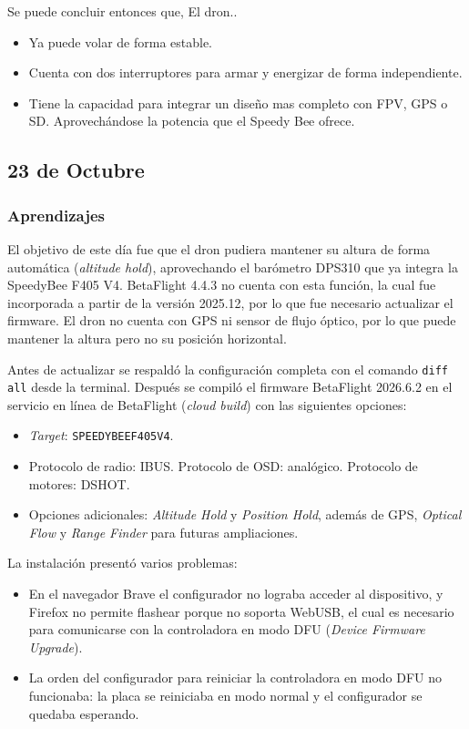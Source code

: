 \documentclass[pdflatex,sn-mathphys-num]{sn-jnl}%
\begin{document}
Se puede concluir entonces que, El dron..
\begin{itemize}
    \item Ya puede volar de forma estable.
    \item Cuenta con dos interruptores para armar y energizar de forma independiente.
    \item Tiene la capacidad para integrar un diseño mas completo con FPV, GPS o SD. Aprovechándose la potencia que el Speedy Bee ofrece.
\end{itemize}

\subsection{23 de Octubre \label{sec:10-23}}
\subsubsection{Aprendizajes}
El objetivo de este día fue que el dron pudiera mantener su altura de forma automática (\textit{altitude hold}), aprovechando el barómetro DPS310 que ya integra la SpeedyBee F405 V4. BetaFlight 4.4.3 no cuenta con esta función, la cual fue incorporada a partir de la versión 2025.12, por lo que fue necesario actualizar el firmware. El dron no cuenta con GPS ni sensor de flujo óptico, por lo que puede mantener la altura pero no su posición horizontal.

Antes de actualizar se respaldó la configuración completa con el comando \texttt{diff all} desde la terminal. Después se compiló el firmware BetaFlight 2026.6.2 en el servicio en línea de BetaFlight (\textit{cloud build}) con las siguientes opciones:
\begin{itemize}
    \item \textit{Target}: \texttt{SPEEDYBEEF405V4}.
    \item Protocolo de radio: IBUS. Protocolo de OSD: analógico. Protocolo de motores: DSHOT.
    \item Opciones adicionales: \textit{Altitude Hold} y \textit{Position Hold}, además de GPS, \textit{Optical Flow} y \textit{Range Finder} para futuras ampliaciones.
\end{itemize}

La instalación presentó varios problemas:
\begin{itemize}
    \item En el navegador Brave el configurador no lograba acceder al dispositivo, y Firefox no permite flashear porque no soporta WebUSB, el cual es necesario para comunicarse con la controladora en modo DFU (\textit{Device Firmware Upgrade}).
    \item La orden del configurador para reiniciar la controladora en modo DFU no funcionaba: la placa se reiniciaba en modo normal y el configurador se quedaba esperando.
\end{itemize}
\end{document}
